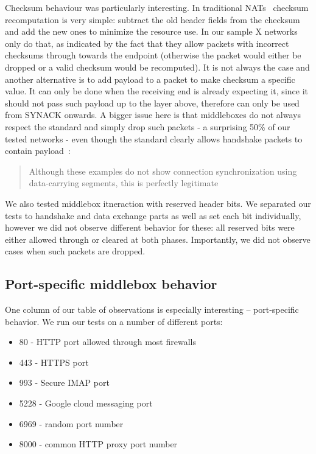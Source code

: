 \documentclass{sig-alternate-10pt}
\begin{document}
Checksum behaviour was particularly interesting. In traditional NATs~\cite{Egevang:tu} checksum recomputation is very simple: subtract the old header fields from the checksum and add the new ones to minimize the resource use. In our sample X networks only do that, as indicated by the fact that they allow packets with incorrect checksums through towards the endpoint (otherwise the packet would either be dropped or a valid checksum would be recomputed). It is not always the case and another alternative is to add payload to a packet to make checksum a specific value. It can only be done when the receiving end is already expecting it, since it should not pass such payload up to the layer above, therefore can only be used from SYNACK onwards. A bigger issue here is that middleboxes do not always respect the standard and simply drop such packets - a surprising 50\% of our tested networks - even though the standard clearly allows handshake packets to contain payload~\cite{Postel:3EDyoxP_,Chu:2011tn}:

\begin{quotation}
    Although these examples do not show connection synchronization using data-carrying segments, this is perfectly legitimate
\end{quotation}

We also tested middlebox itneraction with reserved header bits. We separated our tests to handshake and data exchange parts as well as set each bit individually, however we did not observe different behavior for these: all reserved bits were either allowed through or cleared at both phases. Importantly, we did not observe cases when such packets are dropped.


\subsection{Port-specific middlebox behavior}
\label{sec:portspec}

One column of our table of observations is especially interesting -- port-specific behavior. We run our tests on a number of different ports:
\begin{itemize}
    \item 80 - HTTP port allowed through most firewalls
    \item 443 - HTTPS port
    \item 993 - Secure IMAP port
    \item 5228 - Google cloud messaging port
    \item 6969 - random port number
    \item 8000 - common HTTP proxy port number
\end{itemize}
\end{document}
